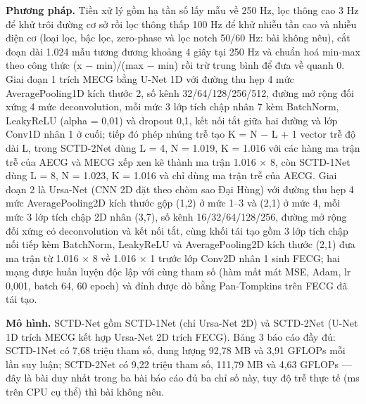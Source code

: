 \documentclass[12pt,a4paper]{article}
\begin{document}
\noindent \textbf{Phương pháp.} Tiền xử lý gồm hạ tần số lấy mẫu về 250 Hz, lọc thông cao 3 Hz để khử trôi đường cơ sở rồi lọc thông thấp 100 Hz để khử nhiễu tần cao và nhiễu điện cơ (loại lọc, bậc lọc, zero-phase và lọc notch 50/60 Hz: bài không nêu), cắt đoạn dài 1.024 mẫu tương đương khoảng 4 giây tại 250 Hz và chuẩn hoá min-max theo công thức (x − min)/(max − min) rồi trừ trung bình để đưa về quanh 0. Giai đoạn 1 trích MECG bằng U-Net 1D với đường thu hẹp 4 mức AveragePooling1D kích thước 2, số kênh 32/64/128/256/512, đường mở rộng đối xứng 4 mức deconvolution, mỗi mức 3 lớp tích chập nhân 7 kèm BatchNorm, LeakyReLU (alpha = 0,01) và dropout 0,1, kết nối tắt giữa hai đường và lớp Conv1D nhân 1 ở cuối; tiếp đó phép nhúng trễ tạo K = N − L + 1 vector trễ độ dài L, trong SCTD-2Net dùng L = 4, N = 1.019, K = 1.016 với các hàng ma trận trễ của AECG và MECG xếp xen kẽ thành ma trận 1.016 × 8, còn SCTD-1Net dùng L = 8, N = 1.023, K = 1.016 và chỉ dùng ma trận trễ của AECG. Giai đoạn 2 là Ursa-Net (CNN 2D đặt theo chòm sao Đại Hùng) với đường thu hẹp 4 mức AveragePooling2D kích thước gộp (1,2) ở mức 1–3 và (2,1) ở mức 4, mỗi mức 3 lớp tích chập 2D nhân (3,7), số kênh 16/32/64/128/256, đường mở rộng đối xứng có deconvolution và kết nối tắt, cùng khối tái tạo gồm 3 lớp tích chập nối tiếp kèm BatchNorm, LeakyReLU và AveragePooling2D kích thước (2,1) đưa ma trận từ 1.016 × 8 về 1.016 × 1 trước lớp Conv2D nhân 1 sinh FECG; hai mạng được huấn luyện độc lập với cùng tham số (hàm mất mát MSE, Adam, lr 0,001, batch 64, 60 epoch) và đỉnh được dò bằng Pan-Tompkins trên FECG đã tái tạo.\par\vspace{3pt}
\noindent \textbf{Mô hình.} SCTD-Net gồm SCTD-1Net (chỉ Ursa-Net 2D) và SCTD-2Net (U-Net 1D trích MECG kết hợp Ursa-Net 2D trích FECG). Bảng 3 báo cáo đầy đủ: SCTD-1Net có 7,68 triệu tham số, dung lượng 92,78 MB và 3,91 GFLOPs mỗi lần suy luận; SCTD-2Net có 9,22 triệu tham số, 111,79 MB và 4,63 GFLOPs — đây là bài duy nhất trong ba bài báo cáo đủ ba chỉ số này, tuy độ trễ thực tế (ms trên CPU cụ thể) thì bài không nêu.\par\vspace{3pt}
\end{document}
